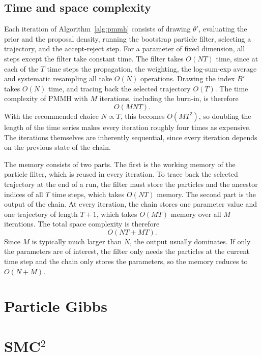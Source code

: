 \subsection{Time and space complexity}
\label{sec:pmmh_complexity}
Each iteration of Algorithm~\ref{alg:pmmh} consists of drawing $\theta'$, evaluating the prior and the proposal density, running the bootstrap particle filter, selecting a trajectory, and the accept-reject step. For a parameter of fixed dimension, all steps except the filter take constant time. The filter takes $O(NT)$ time, since at each of the $T$ time steps the propagation, the weighting, the log-sum-exp average and systematic resampling all take $O(N)$ operations. Drawing the index $B'$ takes $O(N)$ time, and tracing back the selected trajectory $O(T)$. The time complexity of PMMH with $M$ iterations, including the burn-in, is therefore
\begin{equation}
    O(MNT).
\end{equation}
With the recommended choice $N\propto T$, this becomes $O(MT^2)$, so doubling the length of the time series makes every iteration roughly four times as expensive. The iterations themselves are inherently sequential, since every iteration depends on the previous state of the chain.

The memory consists of two parts. The first is the working memory of the particle filter, which is reused in every iteration. To trace back the selected trajectory at the end of a run, the filter must store the particles and the ancestor indices of all $T$ time steps, which takes $O(NT)$ memory. The second part is the output of the chain. At every iteration, the chain stores one parameter value and one trajectory of length $T+1$, which takes $O(MT)$ memory over all $M$ iterations. The total space complexity is therefore
\begin{equation}
    O(NT + MT).
\end{equation}
Since $M$ is typically much larger than $N$, the output usually dominates. If only the parameters are of interest, the filter only needs the particles at the current time step and the chain only stores the parameters, so the memory reduces to $O(N+M)$.

\section{Particle Gibbs}
\label{sec:particle_gibbs}

\section{SMC$^2$}